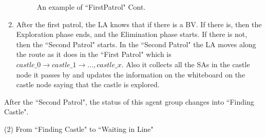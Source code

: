 \begin{enumerate}
\begin{figure} [H]
      \hspace{1in} 
  \caption{An example of  ``FirstPatrol" Cont.} 
  \label{fig:FirstPatrol} %
\end{figure}

\item 
After the first patrol, the LA knows that if there is a BV. If there is, then the Exploration phase ends, and the Elimination phase starts. If there is not, then the ``Second Patrol" starts. In the ``Second Patrol" the LA moves along the route as it does in the ``First Patrol" which is $castle\_0\rightarrow castle\_1 \rightarrow\ldots, castle\_x$. Also it collects all the SAs in the castle node it passes by and updates the information on the whiteboard on the castle node saying that the castle is explored. 
\end{enumerate}  
After the ``Second Patrol", the status of this agent group changes into ``Finding Castle". 


(2) From ``Finding Castle" to ``Waiting in Line"

